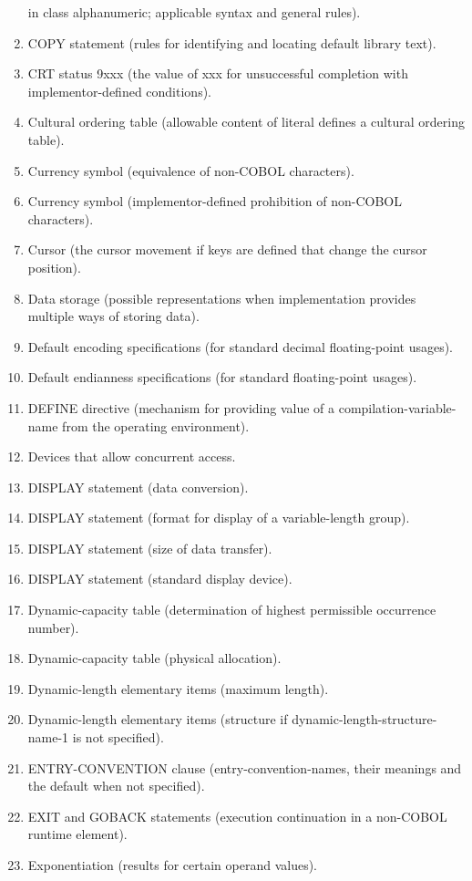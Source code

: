 \begin{enumerate}
  in class alphanumeric; applicable syntax and general rules).
\item COPY statement (rules for identifying and locating default library text).
\item CRT status 9xxx (the value of xxx for unsuccessful completion with implementor-defined conditions).
\item Cultural ordering table (allowable content of literal defines a cultural ordering table).
\item Currency symbol (equivalence of non-COBOL characters).
\item Currency symbol (implementor-defined prohibition of non-COBOL characters).
\item Cursor (the cursor movement if keys are defined that change the cursor position).
\item Data storage (possible representations when implementation provides multiple ways of storing data).
\item Default encoding specifications (for standard decimal floating-point usages).
\item Default endianness specifications (for standard floating-point usages).
\item DEFINE directive (mechanism for providing value of a compilation-variable-name from the operating environment).
\item Devices that allow concurrent access.
\item DISPLAY statement (data conversion).
\item DISPLAY statement (format for display of a variable-length group).
\item DISPLAY statement (size of data transfer).
\item DISPLAY statement (standard display device).
\item Dynamic-capacity table (determination of highest permissible occurrence number).
\item Dynamic-capacity table (physical allocation).
\item Dynamic-length elementary items (maximum length).
\item Dynamic-length elementary items (structure if dynamic-length-structure-name-1 is not specified).
\item ENTRY-CONVENTION clause (entry-convention-names, their meanings and the default when not specified).
\item EXIT and GOBACK statements (execution continuation in a non-COBOL runtime element).
\item Exponentiation (results for certain operand values).

\end{enumerate}
